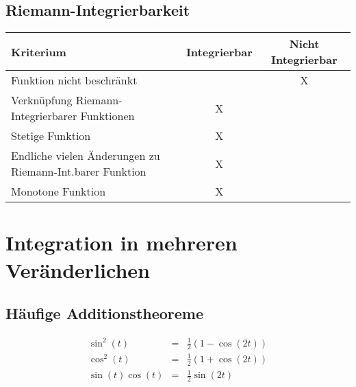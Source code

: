\section{Riemann-Integrierbarkeit}
\begin{center}
    \begin{tabular}{lcc}
        \toprule
        Kriterium & Integrierbar & Nicht Integrierbar \\
        \midrule
        Funktion nicht beschränkt & & X \\
        Verknüpfung Riemann-Integrierbarer Funktionen & X \\
        Stetige Funktion & X\\
        Endliche vielen Änderungen zu Riemann-Int.barer Funktion & X\\
        Monotone Funktion & X\\
        \bottomrule
    \end{tabular}
\end{center}

\chapter{Integration in mehreren Veränderlichen}
\section{Häufige Additionstheoreme}
\begin{eqnarray*}
    \sin^2(t) &=& \frac{1}{2} (1 - \cos(2t))\\
    \cos^2(t) &=& \frac{1}{2} (1 + \cos(2t))\\
    \sin(t) \cos(t) &=& \frac{1}{2} \sin(2t)
\end{eqnarray*}
